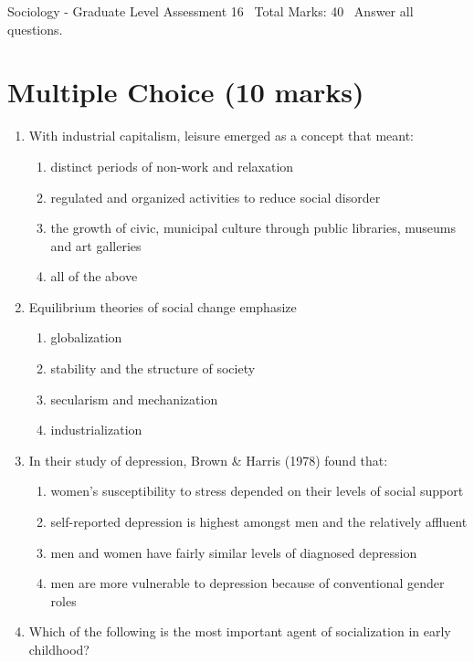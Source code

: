 \documentclass[12pt]{article}
\begin{document}
\begin{center}
Sociology - Graduate Level Assessment 16 \
Total Marks: 40 \
Answer all questions.
\end{center}

\section*{Multiple Choice (10 marks)}
\begin{enumerate}[label=\arabic*.]
\item With industrial capitalism, leisure emerged as a concept that meant:
\begin{enumerate}[label=(\alph*)]
    \item distinct periods of non-work and relaxation
    \item regulated and organized activities to reduce social disorder
    \item the growth of civic, municipal culture through public libraries, museums and art galleries
    \item all of the above
\end{enumerate}
\item Equilibrium theories of social change emphasize
\begin{enumerate}[label=(\alph*)]
    \item globalization
    \item stability and the structure of society
    \item secularism and mechanization
    \item industrialization
\end{enumerate}
\item In their study of depression, Brown \& Harris (1978) found that:
\begin{enumerate}[label=(\alph*)]
    \item women's susceptibility to stress depended on their levels of social support
    \item self-reported depression is highest amongst men and the relatively affluent
    \item men and women have fairly similar levels of diagnosed depression
    \item men are more vulnerable to depression because of conventional gender roles
\end{enumerate}
\item Which of the following is the most important agent of socialization in early childhood?
\begin{enumerate}[label=(\alph*)]

\end{enumerate}
\end{enumerate}
\end{document}

